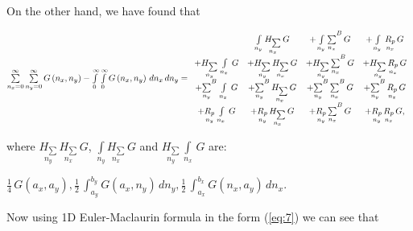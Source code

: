 \documentclass[twoside, 10pt]{article}
\begin{document}
\begin{multicols}{2}
    On the other hand, we have found that

\noindent
\(\sum\limits_{n_x=0}^{\infty} \sum\limits_{n_y=0}^{\infty} G\left(n_x, n_y\right) -\int\limits_{0}^{\infty} \int\limits_{0}^{\infty} G\left(n_x, n_y\right)\,d{n_x}\,d{n_y} = \\
 \begin{array}{cccc}  \, &  \int\limits_{n_y}^{} \underset{n_x}{H_{\sum}}\,G &  + \int\limits_{n_y}^{}{\sum\limits_{n_x}^{}}^{B}\,G &  + \int\limits_{n_y}^{}\,\underset{n_x}{R_{p}}\,G \\
  +\underset{n_y}{H_{\sum}}\,\int\limits_{n_x}^{}\,G &  + \underset{n_y}{H_{\sum}}\,\underset{n_x}{H_{\sum}}\,G &  + \underset{n_y}{H_{\sum}}\,{\sum\limits_{n_x}^{}}^{B}\,G &  + \underset{n_y}{H_{\sum}}\,\underset{n_x}{R_{p}}\,G \\
  + {\sum\limits_{n_y}^{}}^{B}\,\int\limits_{n_x}^{}\,G &  + {\sum\limits_{n_y}^{}}^{B}\,\underset{n_x}{H_{\sum}}\,G &  + {\sum\limits_{n_y}^{}}^{B}\,{\sum\limits_{n_x}^{}}^{B}\,G &  + {\sum\limits_{n_y}^{}}^{B}\,\underset{n_x}{R_{p}}\,G \\
  + \underset{n_y}{R_{p}}\,\int\limits_{n_x}^{}\,G &  + \underset{n_y}{R_{p}}\,\underset{n_x}{H_{\sum}}\,G &  + \underset{n_y}{R_{p}}\,{\sum\limits_{n_x}^{}}^{B}\,G &  + \underset{n_y}{R_{p}}\,\underset{n_x}{R_{p}}\,G, \end{array}\)

    where \(\underset{n_y}{H_{\sum}}\,\underset{n_x}{H_{\sum}}\,G\),
\(\int\limits_{n_y}^{} \underset{n_x}{H_{\sum}}\,G\) and
\(\underset{n_y}{H_{\sum}}\,\int\limits_{n_x}^{}\,G\) are:

\noindent
    \(\frac{1}{4} \, G\left(a_{x}, a_{y}\right) , \frac{1}{2} \, \int_{a_{y}}^{b_{y}} G\left(a_{x}, n_{y}\right)\,{d n_{y}} , \frac{1}{2} \, \int_{a_{x}}^{b_{x}} G\left(n_{x}, a_{y}\right)\,{d n_{x}}.\)

    Now using 1D Euler-Maclaurin formula in the form (\ref{eq:7}) we can see that



\end{multicols}
\end{document}
